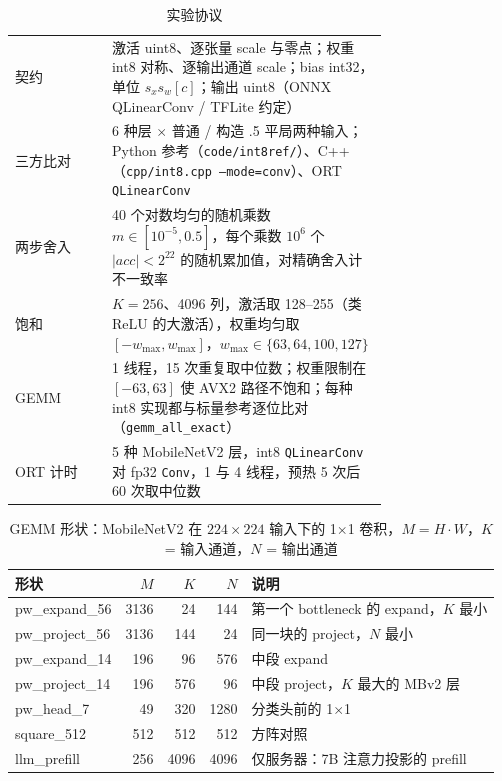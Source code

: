\documentclass[11pt,a4paper]{ctexart}
\begin{document}
\begin{table}[H]
\centering\small
\caption{实验协议}\label{tab:protocol}
\begin{tabular}{lp{0.74\linewidth}}
\toprule
契约 & 激活 uint8、逐张量 scale 与零点；权重 int8 对称、逐输出通道 scale；bias int32，单位 $s_x s_w[c]$；输出 uint8（ONNX QLinearConv / TFLite 约定） \\
三方比对 & 6 种层 $\times$ 普通 / 构造 .5 平局两种输入；Python 参考（\texttt{code/int8ref/}）、C++（\texttt{cpp/int8.cpp --mode=conv}）、ORT \texttt{QLinearConv} \\
两步舍入 & 40 个对数均匀的随机乘数 $m\in[10^{-5},0.5]$，每个乘数 $10^6$ 个 $|acc|<2^{22}$ 的随机累加值，对精确舍入计不一致率 \\
饱和 & $K=256$、4096 列，激活取 128--255（类 ReLU 的大激活），权重均匀取 $[-w_{\max}, w_{\max}]$，$w_{\max}\in\{63,64,100,127\}$ \\
GEMM & 1 线程，15 次重复取中位数；权重限制在 $[-63,63]$ 使 AVX2 路径不饱和；每种 int8 实现都与标量参考逐位比对（\texttt{gemm\_all\_exact}） \\
ORT 计时 & 5 种 MobileNetV2 层，int8 \texttt{QLinearConv} 对 fp32 \texttt{Conv}，1 与 4 线程，预热 5 次后 60 次取中位数 \\
\bottomrule
\end{tabular}
\end{table}

\begin{table}[H]
\centering\small
\caption{GEMM 形状：MobileNetV2 在 $224\times224$ 输入下的 1$\times$1 卷积，$M=H\cdot W$，$K$ = 输入通道，$N$ = 输出通道}\label{tab:shapes}
\begin{tabular}{lrrrl}
\toprule
形状 & $M$ & $K$ & $N$ & 说明 \\
\midrule
pw\_expand\_56 & 3136 & 24 & 144 & 第一个 bottleneck 的 expand，$K$ 最小 \\
pw\_project\_56 & 3136 & 144 & 24 & 同一块的 project，$N$ 最小 \\
pw\_expand\_14 & 196 & 96 & 576 & 中段 expand \\
pw\_project\_14 & 196 & 576 & 96 & 中段 project，$K$ 最大的 MBv2 层 \\
pw\_head\_7 & 49 & 320 & 1280 & 分类头前的 1$\times$1 \\
square\_512 & 512 & 512 & 512 & 方阵对照 \\
llm\_prefill & 256 & 4096 & 4096 & 仅服务器：7B 注意力投影的 prefill \\
\bottomrule
\end{tabular}
\end{table}
\end{document}
